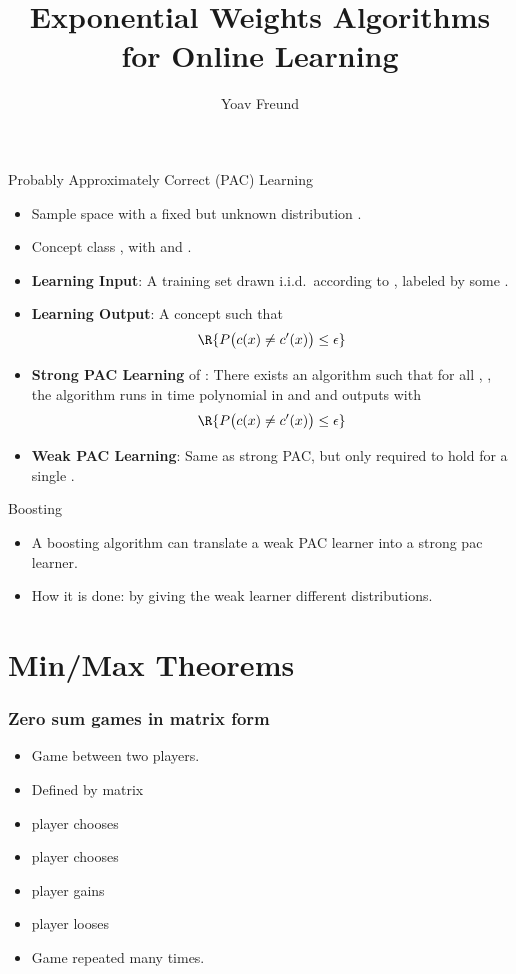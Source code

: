 \documentclass{beamer}
\title[\ouralg] %
{Exponential Weights Algorithms for Online Learning}
\author[Freund] %
{Yoav Freund}
\date{}
\institute[Universities of Somewhere and Elsewhere] %
\begin{document}
\begin{frame}
  \titlepage
  \begin{small}
  \end{small}
\end{frame}


\begin{frame}{Probably Approximately Correct (PAC) Learning}
  \begin{itemize}
    \item Sample space  with a fixed but unknown distribution .
    \item Concept class , with  and .
    \item \textbf{Learning Input}: A training set  
          drawn i.i.d.\ according to , labeled by some .
    \item \textbf{Learning Output}: A concept  such that 
      \[
         \R{P\bigl(c(x) \neq c'(x)\bigr) \leq \epsilon}
      \]
    \item \textbf{Strong PAC Learning} of : There exists an algorithm such that 
      for all \R{$\epsilon$}, \R{$\delta$}, the algorithm runs in time polynomial 
      in  and  and outputs  with
      \[
        \R{P\bigl(c(x) \neq c'(x)\bigr) \leq \epsilon}
      \]
    \item \textbf{Weak PAC Learning}: Same as strong PAC, 
      but only required to hold for a single .
  \end{itemize}
\end{frame}

\begin{frame}{Boosting}
  \begin{itemize}
  \item A boosting algorithm can translate a weak PAC learner into a strong pac learner.
  \item How it is done: by giving the weak learner different distributions.
  \end{itemize}
  \end{frame}

\section{Min/Max Theorems}

\begin{frame}
\frametitle{Zero sum games in matrix form}
\begin{itemize}
\item Game between two players.
\item Defined by  matrix \R{$\M$}
\item {} player chooses 
\item {} player chooses 
\item {} player gains 
\item {} player looses 
\item Game repeated many times.
\end{itemize}
\end{frame}
\end{document}
